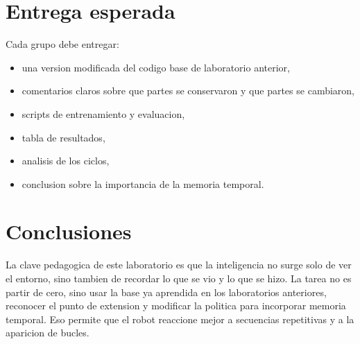 \documentclass[11pt,a4paper]{article}
\begin{document}
\section{Entrega esperada}
Cada grupo debe entregar:

\begin{itemize}[leftmargin=*]
  \item una version modificada del codigo base de laboratorio anterior,
  \item comentarios claros sobre que partes se conservaron y que partes se cambiaron,
  \item scripts de entrenamiento y evaluacion,
  \item tabla de resultados,
  \item analisis de los ciclos,
  \item conclusion sobre la importancia de la memoria temporal.
\end{itemize}

\section{Conclusiones}
La clave pedagogica de este laboratorio es que la inteligencia no surge solo de ver el entorno, sino tambien de recordar lo que se vio y lo que se hizo. La tarea no es partir de cero, sino usar la base ya aprendida en los laboratorios anteriores, reconocer el punto de extension y modificar la politica para incorporar memoria temporal. Eso permite que el robot reaccione mejor a secuencias repetitivas y a la aparicion de bucles.
\end{document}
